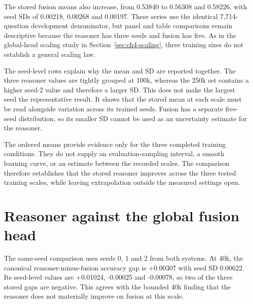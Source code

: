 The stored fusion means also increase, from 0.53840 to 0.56308 and 0.58226,
with seed SDs of 0.00218, 0.00268 and 0.00197. These series use the identical
7,714-question development denominator, but panel and table comparisons remain
descriptive because the reasoner has three seeds and fusion has five. As in the
global-head scaling study in Section~\ref{sec:ch4-scaling}, three training
sizes do not establish a general scaling law.

The seed-level rows explain why the mean and SD are reported together. The
three reasoner values are tightly grouped at 100k, whereas the 250k set contains
a higher seed-2 value and therefore a larger SD. This does not make the largest
seed the representative result. It shows that the stored mean at each scale
must be read alongside variation across its trained seeds. Fusion has a
separate five-seed distribution, so its smaller SD cannot be used as an
uncertainty estimate for the reasoner.

The ordered means provide evidence only for the three completed training
conditions. They do not supply an evaluation-sampling interval, a smooth
learning curve, or an estimate between the recorded scales. The comparison
therefore establishes that the stored reasoner improves across the three tested
training scales, while leaving extrapolation outside the measured settings
open.

\begin{table}[p]
\centering
\caption[Reasoner and fusion accuracy by training scale.]{Development accuracy on the 7,714-row top-100 view. Reasoner levels use seeds 0/1/2; displayed fusion levels use seeds 0/1/2/3/42. The R--F gaps are canonical reasoner-minus-fusion comparisons on seeds 0/1/2 only and have no clustered interval. SD is variation across training seeds, not a confidence interval.}
\label{tab:ch5-scaling}
\begingroup\scriptsize\setlength{\tabcolsep}{1pt}
\renewenvironment{longtable}[1]{\begin{tabular}{|p{0.075\textwidth}|p{0.05\textwidth}|p{0.085\textwidth}|p{0.23\textwidth}|p{0.13\textwidth}|p{0.085\textwidth}|p{0.09\textwidth}|p{0.09\textwidth}|}}{\end{tabular}}
\let\endhead\relax\renewcommand{\_}{\textunderscore\allowbreak}

\endgroup
\end{table}

\section{Reasoner against the global fusion head}
\label{sec:ch5-fusion}
The same-seed comparison uses seeds 0, 1 and 2 from both systems. At
40k, the canonical reasoner-minus-fusion accuracy gap is +0.00307 with seed SD
0.00622. Its seed-level values are +0.01024, -0.00025 and -0.00078, so two of
the three stored gaps are negative. This agrees with the bounded 40k finding
that the reasoner does not materially improve on fusion at this scale.

